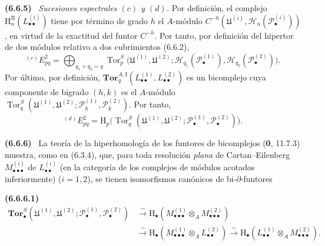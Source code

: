 \documentclass[10pt,oneside]{book}
\newcommand{\oldpage}[2][]{\setcounter{footnote}{0}\marginpar{\scriptsize\textbf{#1}~|~#2}\ignorespaces}
\newenvironment{env}[1][]{\par\medskip\noindent\textbf{(#1)}\ }{\par}
\begin{document}
\oldpage[III]{156}
\begin{env}[6.6.5]
\label{III.6.6.5}
\emph{Sucesiones espectrales $(c)$ y $(d)$.} Por definición, el complejo
$\mathrm H_n^{\mathrm{II}}(L_{\bullet\bullet}^{(i)})$ tiene por término de
grado $h$ el $A$-módulo
$C^{-h}(\mathfrak U^{(i)},\mathscr H_n(\mathscr P_\bullet^{(i)}))$, en virtud
de la exactitud del funtor $C^{-h}$. Por tanto, por definición del hipertor de
dos módulos relativo a dos cubrimientos (6.6.2),
\[
  {}^{(c)}E_{pq}^2
  =\bigoplus_{q_1+q_2=q}
   \operatorname{Tor}_p^S
   \bigl(\mathfrak U^{(1)},\mathfrak U^{(2)};
         \mathscr H_{q_1}(\mathscr P_\bullet^{(1)}),
         \mathscr H_{q_2}(\mathscr P_\bullet^{(2)})\bigr).
\]
Por último, por definición,
$\mathbf{Tor}_q^{A,\mathrm I}
(L_{\bullet\bullet}^{(1)},L_{\bullet\bullet}^{(2)})$ es un bicomplejo cuya
componente de bigrado $(h,k)$ es el $A$-módulo
$\operatorname{Tor}_q^S
(\mathfrak U^{(1)},\mathfrak U^{(2)};
 \mathscr P_h^{(1)},\mathscr P_k^{(2)})$. Por tanto,
\[
  {}^{(d)}E_{pq}^2
  =\mathrm H_p\bigl(
    \operatorname{Tor}_q^S
    (\mathfrak U^{(1)},\mathfrak U^{(2)};
     \mathscr P_\bullet^{(1)},\mathscr P_\bullet^{(2)})\bigr).
\]
\end{env}

\begin{env}[6.6.6]
\label{III.6.6.6}
La teoría de la hiperhomología de los funtores de bicomplejos
(\textbf{0}, 11.7.3) muestra, como en (6.3.4), que, para toda resolución
\emph{plana} de Cartan--Eilenberg $M_{\bullet\bullet\bullet}^{(i)}$ de
$L_{\bullet\bullet}^{(i)}$ (en la categoría de los complejos de módulos
acotados inferiormente) ($i=1,2$), se tienen isomorfismos canónicos de
bi-$\partial$-funtores
\begin{env}[6.6.6.1]
\label{III.6.6.6.1}
\[
\begin{aligned}
  \mathbf{Tor}_\bullet^S
  (\mathfrak U^{(1)},\mathfrak U^{(2)};
   \mathscr P_\bullet^{(1)},\mathscr P_\bullet^{(2)})
  &\xrightarrow{\sim}
   \mathrm H_\bullet
   (M_{\bullet\bullet\bullet}^{(1)}\otimes_A M_{\bullet\bullet\bullet}^{(2)})\\
  &\xrightarrow{\sim}
   \mathrm H_\bullet
   (M_{\bullet\bullet\bullet}^{(1)}\otimes_A L_{\bullet\bullet}^{(2)})
   \xrightarrow{\sim}
   \mathrm H_\bullet
   (L_{\bullet\bullet}^{(1)}\otimes_A M_{\bullet\bullet\bullet}^{(2)}).
\end{aligned}
\tag{6.6.6.1}
\]
\end{env}
\end{env}
\end{document}
